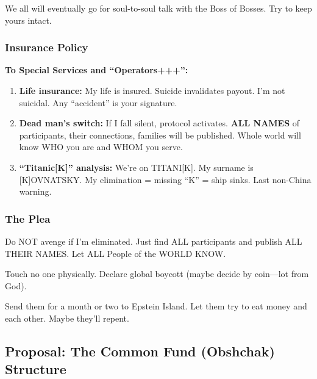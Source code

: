 \documentclass[11pt,a4paper]{article}
\theoremstyle{definition}
\theoremstyle{remark}
\begin{document}
We all will eventually go for soul-to-soul talk with the Boss of Bosses. Try to 
keep yours intact.

\subsubsection{Insurance Policy}

\textbf{To Special Services and ``Operators+++'':}

\begin{enumerate}
\item \textbf{Life insurance:} My life is insured. Suicide invalidates payout. 
I'm not suicidal. Any ``accident'' is your signature.

\item \textbf{Dead man's switch:} If I fall silent, protocol activates. \textbf{ALL 
NAMES} of participants, their connections, families will be published. Whole world 
will know WHO you are and WHOM you serve.

\item \textbf{``Titanic[K]'' analysis:} We're on TITANI[K]. My surname is 
[K]OVNATSKY. My elimination = missing ``K'' = ship sinks. Last non-China warning.
\end{enumerate}

\subsubsection{The Plea}

Do NOT avenge if I'm eliminated. Just find ALL participants and publish ALL THEIR 
NAMES. Let ALL People of the WORLD KNOW.

Touch no one physically. Declare global boycott (maybe decide by coin—lot from God).

Send them for a month or two to Epstein Island. Let them try to eat money and 
each other. Maybe they'll repent.


\subsection{Proposal: The Common Fund (Obshchak) Structure}
\end{document}
